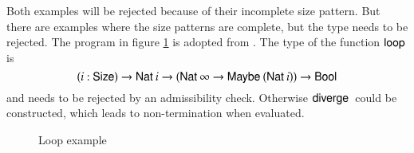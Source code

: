 Both examples will be rejected because of their incomplete size pattern.
But there are examples where the size patterns are complete, but the type needs to be rejected.
The program in figure \ref{loop} is adopted from \cite{abel:PhD}. The type of the function $\mathsf{loop}\:$ is   
\[( i : \mathsf{Size} ) \rightarrow{\mathsf{Nat}\:i \rightarrow(\mathsf{Nat}\:\infty \rightarrow\mathsf{Maybe}\:(\mathsf{Nat}\:i)) \rightarrow\mathsf{Bool}} \]
and needs to be rejected by an admissibility check. Otherwise $\mathsf{diverge}\:$ could be constructed, which leads to non-termination
when evaluated.
\begin{figure}[p]
\caption{Loop example}
\label{loop}
\end{figure}


